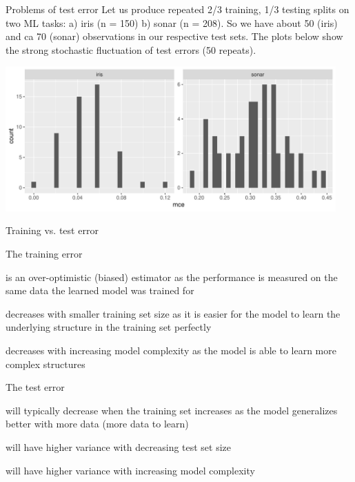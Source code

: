 \documentclass[11pt,compress,t,notes=noshow, xcolor=table]{beamer}
\begin{document}
\begin{vbframe}{Problems of test error}
Let us produce repeated 2/3 training, 1/3 testing splits on two ML tasks: a) iris (n = 150) b) sonar (n = 208).
So we have about 50 (iris) and ca 70 (sonar) observations in our respective test sets.
The plots below show the strong stochastic fluctuation of test errors (50 repeats).

\lz

\includegraphics[width=0.95\textwidth]{figure/test-error-flucuation} 


\end{vbframe}

 
\begin{vbframe}{Training vs. test error}
  \vspace{-0.25cm}
  \begin{blocki}{The training error}
  \vspace{-0.25cm}
    \item is an over-optimistic (biased) estimator as the performance is measured on the same data the learned model was trained for
    \item decreases with smaller training set size as it is easier for the model to learn the underlying structure in the training set perfectly
    \item decreases with increasing model complexity as the model is able to learn more complex structures
  \end{blocki}
  \vspace{-0.25cm}
  \begin{blocki}{The test error}
  \vspace{-0.25cm}
  \item will typically decrease when the training set increases as the model generalizes better with more data (more data to learn)
  \item will have higher variance with decreasing test set size
  \item will have higher variance with increasing model complexity
  \end{blocki}
\end{vbframe}
\end{document}
